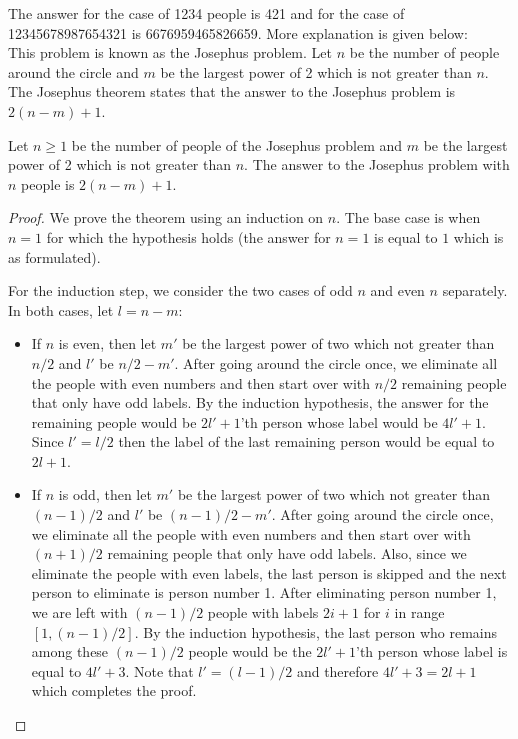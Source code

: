 \begin{solution}
The answer for the case of 1234 people is 421 and for the case of 12345678987654321 is 6676959465826659. More explanation is given below:\\[0.2cm]

This problem is known as the Josephus problem. Let $n$ be the number of people around the circle and $m$ be the largest power of 2 which is not greater than $n$. The Josephus theorem states that the answer to the Josephus problem is $2(n-m)+1$.

\begin{theorem}
	Let $n \geq 1$ be the number of people of the Josephus problem and $m$ be the largest power of 2 which is not greater than $n$. The answer to the Josephus problem with $n$ people is $2(n-m)+1$.
\end{theorem}
\begin{proof}
	We prove the theorem using an induction on $n$. The base case is when $n=1$ for which the hypothesis holds (the answer for $n=1$ is equal to $1$ which is as formulated).
	
	For the induction step, we consider the two cases of odd $n$ and even $n$ separately. In both cases, let $l = n-m$:
	\begin{itemize}
	\item If $n$ is even, then let $m'$ be  the largest power of two which not greater than $n/2$ and $l'$ be $n/2 - m'$. After going around the circle once, we eliminate all the people with even numbers and then start over with $n/2$ remaining people that only have odd labels. By the induction hypothesis, the answer for the remaining people would be $2l'+1$'th person whose label would be $4l'+1$. Since $l' = l/2$ then the label of the last remaining person would be equal to $2l+1$.
	
	\item If $n$ is odd, then let $m'$ be  the largest power of two which not greater than $(n-1)/2$ and $l'$ be $(n-1)/2 - m'$. After going around the circle once, we eliminate all the people with even numbers and then start over with $(n+1)/2$ remaining people that only have odd labels. Also, since we eliminate the people with even labels, the last person is skipped and the next person to eliminate is person number 1. After eliminating person number 1, we are left with $(n-1)/2$ people with labels $2i+1$ for $i$ in range $[1, (n-1)/2]$. By the induction hypothesis, the last person who remains among these $(n-1)/2$ people would be the $2l'+1$'th person whose label is equal to $4l'+3$.  Note that $l' = (l-1)/2$ and therefore $4l'+3 = 2l+1$ which completes the proof.
	\end{itemize}
\end{proof}
\end{solution}